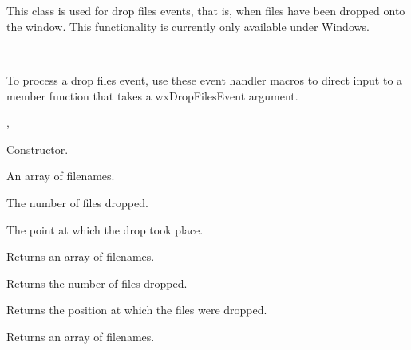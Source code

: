 \section{}\label{wxdropfilesevent}

This class is used for drop files events, that is, when files have been dropped
onto the window. This functionality is currently only available under Windows.


\\


To process a drop files event, use these event handler macros to direct input to a member
function that takes a wxDropFilesEvent argument.

\twocolwidtha{7cm}
\begin{twocollist}\itemsep=0pt
\end{twocollist}%


, 




Constructor.



An array of filenames.



The number of files dropped.



The point at which the drop took place.

\label{wxdropfileseventgetfiles}


Returns an array of filenames.

\label{wxdropfileseventgetnumberoffiles}


Returns the number of files dropped.

\label{wxdropfileseventgetposition}


Returns the position at which the files were dropped.

Returns an array of filenames.


